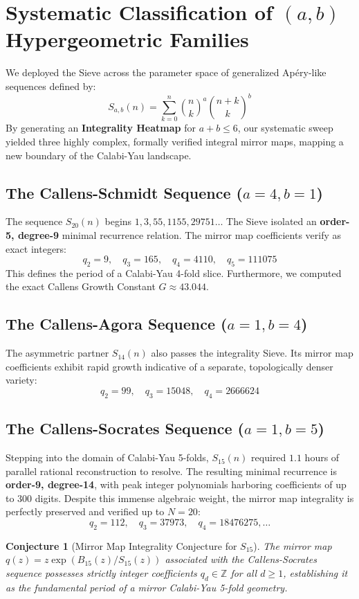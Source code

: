 \documentclass[12pt, reqno]{amsart}
\newtheorem{conjecture}[theorem]{Conjecture}
\begin{document}
\section{Systematic Classification of $(a, b)$ Hypergeometric Families}
We deployed the Sieve across the parameter space of generalized Apéry-like sequences defined by:
\begin{equation}
S_{a,b}(n) = \sum_{k=0}^n \binom{n}{k}^a \binom{n+k}{k}^b
\end{equation}
By generating an \textbf{Integrality Heatmap} for $a+b \le 6$, our systematic sweep yielded three highly complex, formally verified integral mirror maps, mapping a new boundary of the Calabi-Yau landscape.

\subsection{The Callens-Schmidt Sequence ($a=4, b=1$)}
The sequence $S_{20}(n)$ begins $1, 3, 55, 1155, 29751 \dots$
The Sieve isolated an \textbf{order-5, degree-9} minimal recurrence relation. The mirror map coefficients verify as exact integers:
\[ q_2 = 9, \quad q_3 = 165, \quad q_4 = 4110, \quad q_5 = 111075 \]
This defines the period of a Calabi-Yau 4-fold slice. Furthermore, we computed the exact Callens Growth Constant $G \approx 43.044$.

\subsection{The Callens-Agora Sequence ($a=1, b=4$)}
The asymmetric partner $S_{14}(n)$ also passes the integrality Sieve. Its mirror map coefficients exhibit rapid growth indicative of a separate, topologically denser variety:
\[ q_2 = 99, \quad q_3 = 15048, \quad q_4 = 2666624 \]

\subsection{The Callens-Socrates Sequence ($a=1, b=5$)}
Stepping into the domain of Calabi-Yau 5-folds, $S_{15}(n)$ required $1.1$ hours of parallel rational reconstruction to resolve. The resulting minimal recurrence is \textbf{order-9, degree-14}, with peak integer polynomials harboring coefficients of up to 300 digits. 
Despite this immense algebraic weight, the mirror map integrality is perfectly preserved and verified up to $N=20$:
\[ q_2 = 112, \quad q_3 = 37973, \quad q_4 = 18476275, \dots \]

\begin{conjecture}[Mirror Map Integrality Conjecture for $S_{15}$]
The mirror map $q(z) = z \exp(B_{15}(z)/S_{15}(z))$ associated with the Callens-Socrates sequence possesses strictly integer coefficients $q_d \in \mathbb{Z}$ for all $d \ge 1$, establishing it as the fundamental period of a mirror Calabi-Yau 5-fold geometry.
\end{conjecture}
\end{document}
